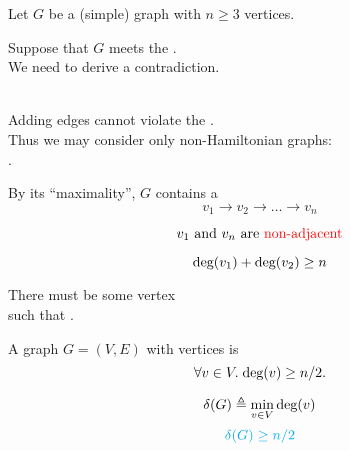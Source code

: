 \begin{frame}{}
  \begin{center}

    \pause
    \vspace{0.30cm}
    Let $G$ be a  (simple) graph with $n \ge 3$ vertices.

    \pause
    \vspace{0.30cm}
    Suppose that $G$ meets the . \\[3pt]
    We need to derive a contradiction.

    \pause
    \vspace{0.80cm}
     \\[3pt] \pause
    Adding edges cannot violate the . \\[3pt] \pause
    Thus we may consider only  non-Hamiltonian graphs: \\[3pt]
    .
  \end{center}
\end{frame}

\begin{frame}{}
  \begin{center}
    By its ``maximality'', $G$ contains a 
    \[
      v_{1} \to v_{2} \to \dots \to v_{n}
    \]

    \pause
    \vspace{-0.60cm}
    \[
      v_{1} \text{ and } v_{n} \text{ are \textcolor{red}{non-adjacent}}
    \]

    \pause
    \vspace{-0.60cm}
    \[
      \text{deg}(v_{1}) + \text{deg}(v_{2}) \ge n
    \]

    \pause
    There must be some vertex  \\[3pt]
    such that .
  \end{center}
\end{frame}

\begin{frame}{}
  \begin{theorem}
    A  graph $G = (V, E)$
    with  vertices is 
    \[
      \forall v \in V.\; \text{deg}(v) \ge n/2.
    \]
  \end{theorem}

  \pause
  \[
    \delta(G) \triangleq \min_{v \in V} \text{deg}(v)
  \]
  \[
    \textcolor{cyan}{\delta(G) \ge n/2}
  \]

  \pause
\end{frame}

